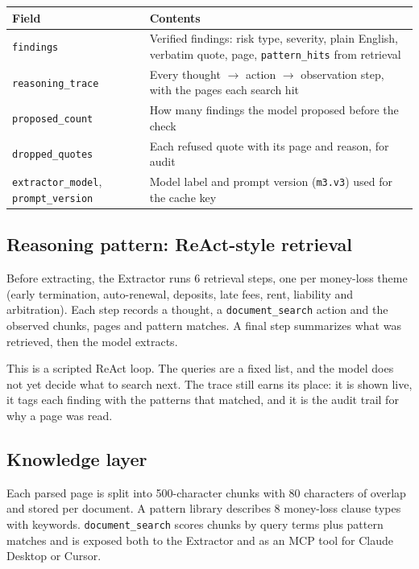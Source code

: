 \documentclass[11pt,letterpaper]{article}
\newcommand{\code}[1]{\texttt{#1}}
\begin{document}
\begin{table}[htbp]
\centering
\small
\begin{tabularx}{\textwidth}{@{}p{4.4cm}L@{}}
\toprule
\textbf{Field} & \textbf{Contents} \\
\midrule
\code{findings} & Verified findings: risk type, severity, plain English, verbatim quote, page, \code{pattern\_hits} from retrieval \\
\code{reasoning\_trace} & Every thought $\rightarrow$ action $\rightarrow$ observation step, with the pages each search hit \\
\code{proposed\_count} & How many findings the model proposed before the check \\
\code{dropped\_quotes} & Each refused quote with its page and reason, for audit \\
\code{extractor\_model}, \code{prompt\_version} & Model label and prompt version (\code{m3.v3}) used for the cache key \\
\bottomrule
\end{tabularx}
\end{table}

\subsection{Reasoning pattern: ReAct-style retrieval}

Before extracting, the Extractor runs 6 retrieval steps, one per money-loss theme (early termination, auto-renewal, deposits, late fees, rent, liability and arbitration). Each step records a thought, a \code{document\_search} action and the observed chunks, pages and pattern matches. A final step summarizes what was retrieved, then the model extracts.

This is a scripted ReAct loop. The queries are a fixed list, and the model does not yet decide what to search next. The trace still earns its place: it is shown live, it tags each finding with the patterns that matched, and it is the audit trail for why a page was read.

\subsection{Knowledge layer}

Each parsed page is split into 500-character chunks with 80 characters of overlap and stored per document. A pattern library describes 8 money-loss clause types with keywords. \code{document\_search} scores chunks by query terms plus pattern matches and is exposed both to the Extractor and as an MCP tool for Claude Desktop or Cursor.
\end{document}
